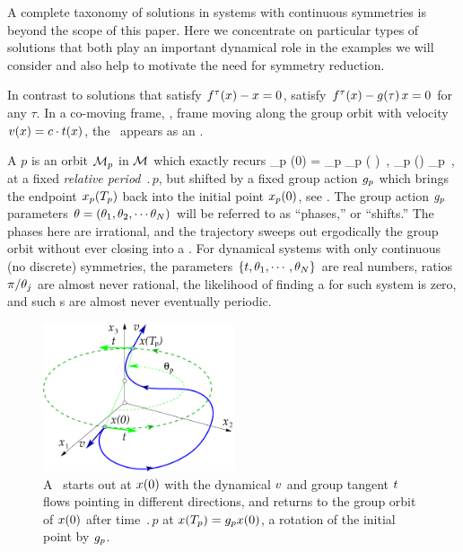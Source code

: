 A complete taxonomy of solutions in systems with continuous symmetries is
beyond the scope of this paper. Here we concentrate on particular types of solutions
that both play an important dynamical role in the examples we will consider and also
help to motivate the need for symmetry reduction.

In contrast to \emph{\eqv} solutions that satisfy
$f^\tau(x) - x = 0$, \emph{\reqva} satisfy $f^\tau(x) -
g( \tau) \, x= 0$ for any $\tau$. In a co-moving frame, \ie, frame moving 
along the group orbit with velocity
$v(x) = c \cdot t(x)$, the \reqv\
appears as an \eqv. 

A {\em \rpo} $p$ is an orbit ${\cal M}_p$ in {\statesp} ${\cal M}$
which exactly recurs
\beq
\ssp_p (0) = \LieEl_p \ssp_p ( )
    \,,\qquad
\ssp_p (\tau) \in \pS_p
    \,,
\label{RPOrelper1}
\eeq
at a fixed {\em relative period} $\period{p}$, but
shifted by a fixed group action ${g_p}$
which brings the endpoint $x_p ({T_{p}} ) $
back into the initial point $x_p (0) $, see .
The group action ${g_p}$ parameters
${\bf \theta} = ({\bf \theta}_1,{\bf \theta}_2,\cdots{\bf \theta}_N)$
will be referred to as ``phases,'' or ``shifts.''
The phases here are irrational, and the trajectory sweeps out
ergodically the group orbit without ever closing into a \po.
For dynamical systems with only continuous (no discrete)
symmetries, the parameters $\{t,{\bf \theta}_1,\cdots,{\bf \theta}_N\}$
are real numbers, ratios $\pi/{\bf \theta}_j$ are almost never
rational, the likelihood of finding a {\po} for such system is
{zero}, and such \rpo s are almost never eventually periodic.

%
\begin{figure}[ht]
\includegraphics[width=0.5\textwidth]{../figs/rpo.eps}
\caption{
A \rpo\ starts out at $x(0)$ with the dynamical $v$ and
group tangent $t$ flows pointing in different
directions, and returns to the group orbit of $x(0)$ after
time $\period{p}$ at $x({T_{p}})=g_p x (0)$, a
rotation of the initial point by $g_p$.
}
\label{f:rpo}
\end{figure}

